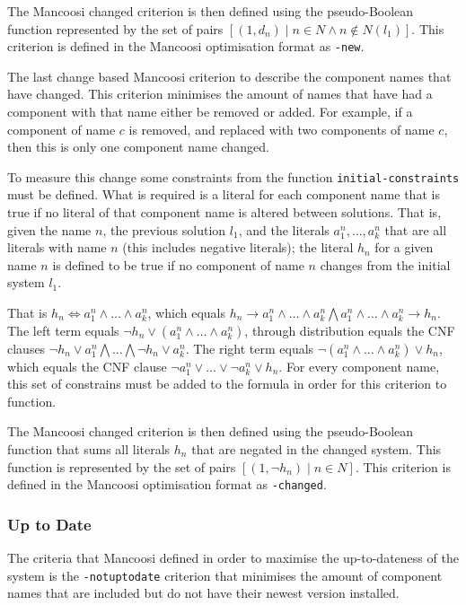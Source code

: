 \begin{defs}
The Mancoosi changed criterion is then defined using the pseudo-Boolean function
 represented by the set of pairs $[(1,d_n) \mid n \in N \wedge n \not \in N(l_1)]$.
This criterion is defined in the Mancoosi optimisation format as \verb+-new+.
\end{defs}

The last change based Mancoosi criterion to describe the component names that have changed.
This criterion minimises the amount of names that have had a component with that name either be removed or added.
For example, if a component of name $c$ is removed, and replaced with two components of name $c$, then this is only one component name changed.

To measure this change some constraints from the function \verb+initial-constraints+ must be defined.
What is required is a literal for each component name that is true if no literal of that component name is altered between solutions.
That is, given the name $n$, the previous solution $l_1$, and the literals $a^n_1, \ldots , a^n_k$ that are all literals with name $n$ (this includes negative literals);
the literal $h_n$ for a given name $n$ is defined to be true if no component of name $n$ changes from the initial system $l_1$.

That is $h_n \Leftrightarrow a^n_1 \wedge \ldots \wedge a^n_k$, 
which equals $h_n \rightarrow a^n_1 \wedge \ldots \wedge a^n_k \bigwedge a^n_1 \wedge \ldots \wedge a^n_k \rightarrow h_n$.
The left term equals $\neg h_n  \vee (a^n_1 \wedge \ldots \wedge a^n_k)$,
through distribution equals the CNF clauses $\neg h_n \vee a^n_1 \bigwedge \ldots \bigwedge \neg h_n \vee a^n_k$.
The right term equals $\neg(a^n_1 \wedge \ldots \wedge a^n_k) \vee h_n$,
which equals the CNF clause $\neg a^n_1 \vee \ldots \vee \neg a^n_k \vee h_n$.
For every component name, this set of constrains must be added to the formula in order for this criterion to function.

\begin{defs}
The Mancoosi changed criterion is then defined using the pseudo-Boolean function
that sums all literals $h_n$ that are negated in the changed system. 
This function is represented by the set of pairs $[(1,\neg h_n) \mid n \in N]$.
This criterion is defined in the Mancoosi optimisation format as \verb+-changed+.
\end{defs}

\subsubsection{Up to Date}
The criteria that Mancoosi defined in order to maximise the up-to-dateness of the system is the \verb+-notuptodate+ 
criterion that minimises the amount of component names that are included but do not have their newest version installed.

